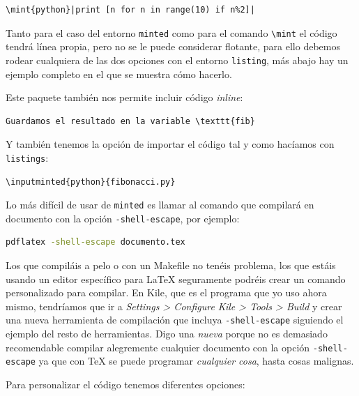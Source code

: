 \begin{lstlisting}[language={[latex]tex}]
\mint{python}|print [n for n in range(10) if n%2]|
\end{lstlisting}

Tanto para el caso del entorno \lstinline!minted! como para el comando
\lstinline!\mint! el código tendrá línea propia, pero no se le puede
considerar flotante, para ello debemos rodear cualquiera de las dos
opciones con el entorno \lstinline!listing!, más abajo hay un ejemplo
completo en el que se muestra cómo hacerlo.

Este paquete también nos permite incluir código \emph{inline}:

\begin{lstlisting}[language={[latex]tex}]
Guardamos el resultado en la variable \texttt{fib}
\end{lstlisting}

Y también tenemos la opción de importar el código tal y como hacíamos
con \lstinline!listings!:

\begin{lstlisting}[language={[latex]tex}]
\inputminted{python}{fibonacci.py}
\end{lstlisting}

Lo más difícil de usar de \lstinline!minted! es llamar al comando que
compilará en documento con la opción \lstinline!-shell-escape!, por
ejemplo:

\begin{lstlisting}[language=bash]
pdflatex -shell-escape documento.tex
\end{lstlisting}

Los que compiláis a pelo o con un Makefile no tenéis problema, los que
estáis usando un editor específico para LaTeX seguramente podréis crear
un comando personalizado para compilar. En Kile, que es el programa que
yo uso ahora mismo, tendríamos que ir a \emph{Settings \textgreater{}
Configure Kile \textgreater{} Tools \textgreater{} Build} y crear una
nueva herramienta de compilación que incluya \lstinline!-shell-escape!
siguiendo el ejemplo del resto de herramientas. Digo una \emph{nueva}
porque no es demasiado recomendable compilar alegremente cualquier
documento con la opción \lstinline!-shell-escape! ya que con TeX se
puede programar \emph{cualquier cosa}, hasta cosas malignas.

Para personalizar el código tenemos diferentes opciones:

